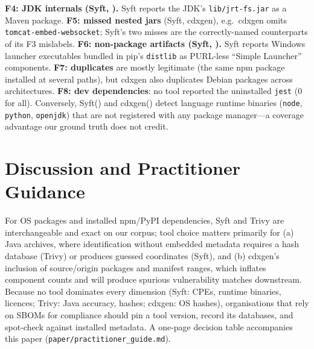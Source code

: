 \documentclass[conference]{IEEEtran}
\newcommand{\syft}{Syft\xspace}
\newcommand{\trivy}{Trivy\xspace}
\newcommand{\cdxgen}{cdxgen\xspace}
\begin{document}
\textbf{F4: JDK internals (\syft, \FailFFourSyft).} \syft reports the JDK's
\texttt{lib/jrt-fs.jar} as a Maven package. \textbf{F5: missed nested jars} (\syft \FailFFiveSyft,
\cdxgen \FailFFiveCdxgen), e.g.\ \cdxgen omits \texttt{tomcat-embed-websocket}; \syft's two misses are
the correctly-named counterparts of its F3 mislabels.
\textbf{F6: non-package artifacts (\syft, \FailFSixSyft).} \syft reports Windows launcher executables
bundled in pip's \texttt{distlib} as PURL-less ``Simple Launcher'' components.
\textbf{F7: duplicates} are mostly legitimate (the same npm package installed at several paths), but
\cdxgen also duplicates Debian packages across architectures.
\textbf{F8: dev dependencies}: no tool reported the uninstalled \texttt{jest} (0 for all).
Conversely, \syft (\FailPOneSyft) and \cdxgen (\FailPOneCdxgen) detect language runtime binaries
(\texttt{node}, \texttt{python}, \texttt{openjdk}) that are not registered with any package manager---a
coverage advantage our ground truth does not credit.



\section{Discussion and Practitioner Guidance}
For OS packages and installed npm/PyPI dependencies, \syft and \trivy are interchangeable and exact on
our corpus; tool choice matters primarily for (a) Java archives, where identification without embedded
metadata requires a hash database (\trivy) or produces guessed coordinates (\syft), and (b) \cdxgen's
inclusion of source/origin packages and manifest ranges, which inflates component counts and will
produce spurious vulnerability matches downstream. Because no tool dominates every dimension
(\syft: CPEs, runtime binaries, licences; \trivy: Java accuracy, hashes; \cdxgen: OS hashes),
organisations that rely on SBOMs for compliance should pin a tool version, record its databases, and
spot-check against installed metadata. A one-page decision table accompanies this paper
(\texttt{paper/practitioner\_guide.md}).

\end{document}
